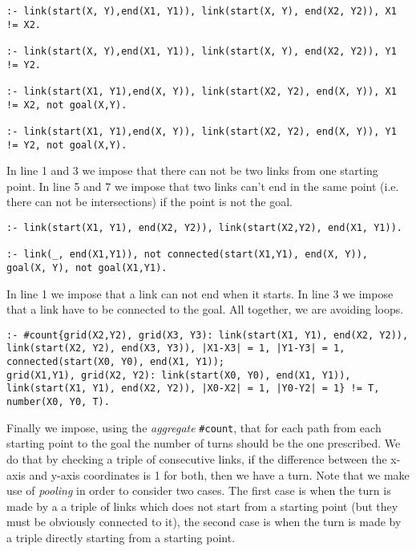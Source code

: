 \begin{verbatim}
:- link(start(X, Y),end(X1, Y1)), link(start(X, Y), end(X2, Y2)), X1 != X2. 

:- link(start(X, Y),end(X1, Y1)), link(start(X, Y), end(X2, Y2)), Y1 != Y2. 

:- link(start(X1, Y1),end(X, Y)), link(start(X2, Y2), end(X, Y)), X1 != X2, not goal(X,Y). 

:- link(start(X1, Y1),end(X, Y)), link(start(X2, Y2), end(X, Y)), Y1 != Y2, not goal(X,Y). 
\end{verbatim}

In line 1 and 3 we impose that there can not be two links from one starting point. In line 5 and 7 we impose that two links can't end in the same point (i.e. there can not be intersections) if the point is not the goal.
\begin{verbatim}
:- link(start(X1, Y1), end(X2, Y2)), link(start(X2,Y2), end(X1, Y1)).

:- link(_, end(X1,Y1)), not connected(start(X1,Y1), end(X, Y)), goal(X, Y), not goal(X1,Y1). 
\end{verbatim}

In line 1 we  impose that a link can not end when it starts. In line 3 we impose that a link have to be connected to the goal. All together, we are avoiding loops.

\begin{verbatim}
:- #count{grid(X2,Y2), grid(X3, Y3): link(start(X1, Y1), end(X2, Y2)), link(start(X2, Y2), end(X3, Y3)), |X1-X3| = 1, |Y1-Y3| = 1, connected(start(X0, Y0), end(X1, Y1));
grid(X1,Y1), grid(X2, Y2): link(start(X0, Y0), end(X1, Y1)), link(start(X1, Y1), end(X2, Y2)), |X0-X2| = 1, |Y0-Y2| = 1} != T, number(X0, Y0, T).
\end{verbatim}

Finally we impose, using the \emph{aggregate} \texttt{#count}, that for each path from each starting point to the goal the number of turns should be the one prescribed. We do that by checking a triple of consecutive links, if the difference between the x-axis and y-axis coordinates is 1 for both, then we have a turn.
 Note that we make use of \emph{pooling} in order to consider two cases. The first case is when the turn is made by a a triple of links which does not start from a starting point (but they must be obviously connected to it), the second case is when the turn is made by a triple directly starting from a starting point.

